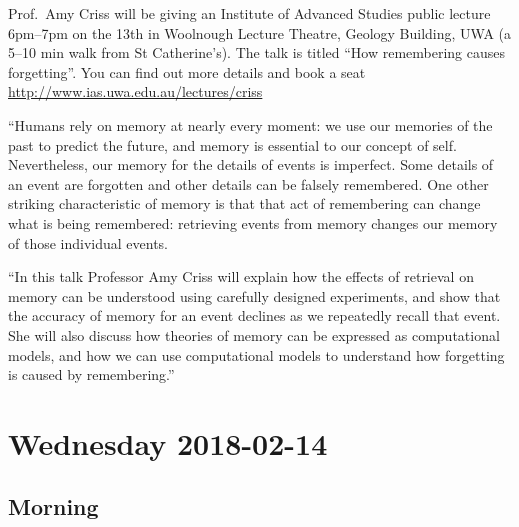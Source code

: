 \documentclass[]{article}
\begin{document}
Prof.~Amy Criss will be giving an Institute of Advanced Studies public
lecture 6pm--7pm on the 13th in Woolnough Lecture Theatre, Geology
Building, UWA (a 5--10 min walk from St Catherine's). The talk is titled
``How remembering causes forgetting''. You can find out more details and
book a seat \url{http://www.ias.uwa.edu.au/lectures/criss}

``Humans rely on memory at nearly every moment: we use our memories of
the past to predict the future, and memory is essential to our concept
of self. Nevertheless, our memory for the details of events is
imperfect. Some details of an event are forgotten and other details can
be falsely remembered. One other striking characteristic of memory is
that that act of remembering can change what is being remembered:
retrieving events from memory changes our memory of those individual
events.

``In this talk Professor Amy Criss will explain how the effects of
retrieval on memory can be understood using carefully designed
experiments, and show that the accuracy of memory for an event declines
as we repeatedly recall that event. She will also discuss how theories
of memory can be expressed as computational models, and how we can use
computational models to understand how forgetting is caused by
remembering.''

\newpage

\renewcommand{\arraystretch}{1.5}

\pagebreak  

\section{Wednesday 2018-02-14}\label{wednesday-2018-02-14}

\subsection{Morning}\label{morning}
\end{document}
